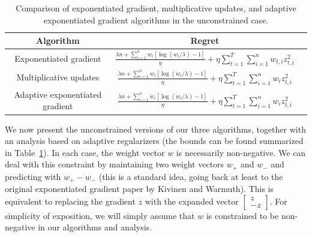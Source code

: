 \documentclass[11pt]{article}
\begin{document}
\begin{table}
\begin{tabular}{|c|c|c|} \hline
        Algorithm & Regret \\ \hline
        Exponentiated gradient & $\frac{\lambda n + \sum_{i=1}^n w_i[\log(w_i/\lambda)-1]}{\eta} + \eta \sum_{t=1}^T \sum_{i=1}^n w_{t,i}z_{t,i}^2$ \\ \hline
        Multiplicative updates & $\frac{\lambda n + \sum_{i=1}^n w_i[\log(w_i/\lambda)-1]}{\eta} + \eta \sum_{t=1}^T \sum_{i=1}^n w_{i}z_{t,i}^2$ \\ \hline
        Adaptive exponentiated gradient & $\frac{\lambda n + \sum_{i=1}^n w_i[\log(w_i/\lambda)-1]}{\eta} + \eta \sum_{t=1}^T \sum_{i=1}^n w_iz_{t,i}^2$ \\ \hline
\end{tabular}
\caption{Comparison of exponentiated gradient, multiplicative updates, and adaptive exponentiated gradient algorithms in the unconstrained case.}
\label{fig:unconstrained}
\end{table}

We now present the unconstrained versions of our three algorithms, together 
with an analysis based on adaptive regularizers (the bounds can be found summarized 
in Table~\ref{fig:unconstrained}). In each case, the weight 
vector $w$ is necessarily non-negative. We can deal with this constraint by 
maintaining two weight vectors $w_+$ and $w_-$ and predicting with $w_+-w_-$ 
(this is a standard idea, going back at least to the original exponentiated 
gradient paper by Kivinen and Warmuth). This is equivalent to replacing the 
gradient $z$ with the expanded vector $\left[ \begin{array}{cc} z \\ -z \end{array} \right]$. 
For simplicity of exposition, we will simply assume that $w$ is constrained 
to be non-negative in our algorithms and analysis.
\end{document}
